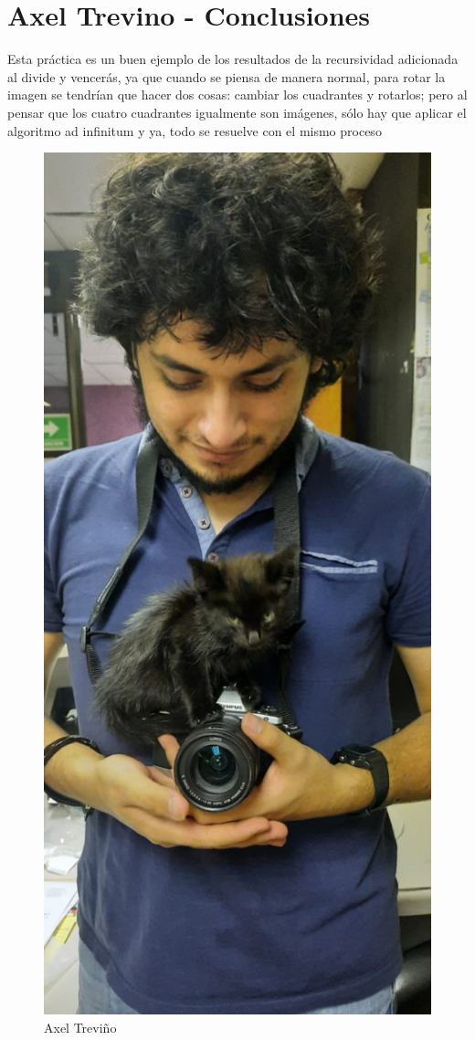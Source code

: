 \newpage
\section{Axel Trevino - Conclusiones}
    Esta práctica es un buen ejemplo de los resultados de la recursividad adicionada al divide y vencerás, ya que cuando se piensa de manera normal, para rotar la imagen se tendrían que hacer dos cosas: cambiar los cuadrantes y rotarlos; pero al pensar que los cuatro cuadrantes igualmente son imágenes, sólo hay que aplicar el algoritmo ad infinitum y ya, todo se resuelve con el mismo proceso
    \begin{figure}[htp!]
            \centering
            \includegraphics[width=0.4 \textwidth]{Images/Fotos_Alumnos/axel.jpg}  
            \caption{Axel Treviño}
            \label{fig:my_label2}
        \end{figure}
